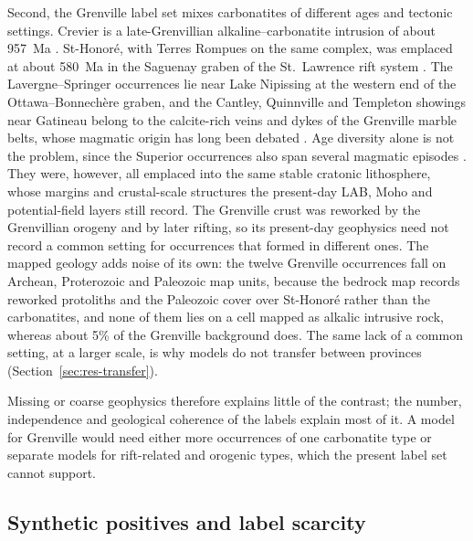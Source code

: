 \documentclass[pdflatex,sn-apa]{sn-jnl}
\begin{document}
Second, the Grenville label set mixes carbonatites of different ages and tectonic settings. Crevier is a late-Grenvillian alkaline--carbonatite intrusion of about 957~Ma \citep{Groulier2020}. St-Honoré, with Terres Rompues on the same complex, was emplaced at about 580~Ma in the Saguenay graben of the St.~Lawrence rift system \citep{Neron2018}. The Lavergne--Springer occurrences lie near Lake Nipissing at the western end of the Ottawa--Bonnech\`ere graben, and the Cantley, Quinnville and Templeton showings near Gatineau belong to the calcite-rich veins and dykes of the Grenville marble belts, whose magmatic origin has long been debated \citep{Moecher1997}. Age diversity alone is not the problem, since the Superior occurrences also span several magmatic episodes \citep{Rukhlov2010}. They were, however, all emplaced into the same stable cratonic lithosphere, whose margins and crustal-scale structures the present-day LAB, Moho and potential-field layers still record. The Grenville crust was reworked by the Grenvillian orogeny and by later rifting, so its present-day geophysics need not record a common setting for occurrences that formed in different ones. The mapped geology adds noise of its own: the twelve Grenville occurrences fall on Archean, Proterozoic and Paleozoic map units, because the bedrock map records reworked protoliths and the Paleozoic cover over St-Honoré rather than the carbonatites, and none of them lies on a cell mapped as alkalic intrusive rock, whereas about 5\% of the Grenville background does. The same lack of a common setting, at a larger scale, is why models do not transfer between provinces (Section~\ref{sec:res-transfer}).

Missing or coarse geophysics therefore explains little of the contrast; the number, independence and geological coherence of the labels explain most of it. A model for Grenville would need either more occurrences of one carbonatite type or separate models for rift-related and orogenic types, which the present label set cannot support.

\subsection{Synthetic positives and label scarcity}\label{sec:disc-gan}
\end{document}
